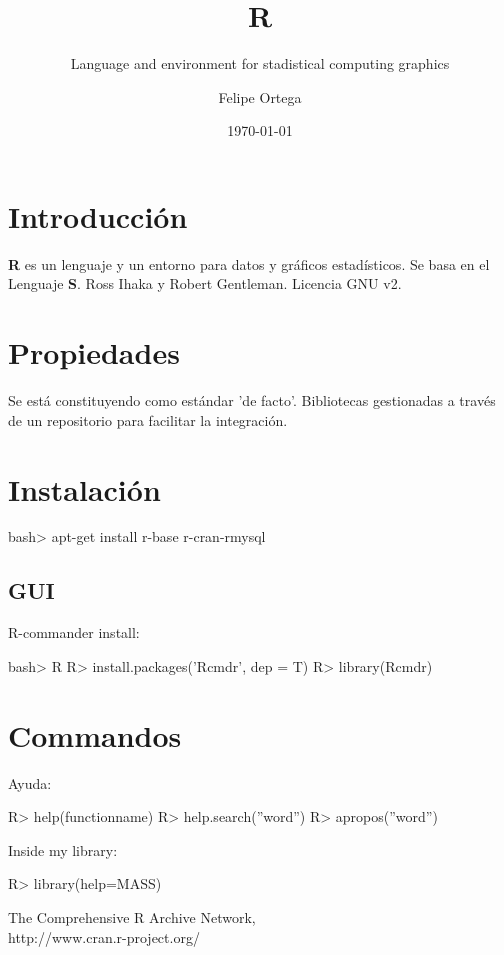 \documentclass[11pt]{scrartcl}
\title{\textbf{R}}
\subtitle{Language and environment for stadistical computing graphics}
\author{Felipe Ortega}
\date{\today}
\begin{document}
\maketitle

\section{Introducci\'on}

\textbf{R} es un lenguaje y un entorno para datos y gr\'aficos estad\'isticos.
Se basa en el Lenguaje \textbf{S}. 
Ross Ihaka y Robert Gentleman.
Licencia  GNU v2.

\section{Propiedades}

Se est\'a constituyendo como est\'andar 'de facto'.
Bibliotecas gestionadas a trav\'es de un repositorio para facilitar la integraci\'on.

\section{Instalaci\'on}

	bash> apt-get install r-base r-cran-rmysql

\subsection{GUI}

R-commander install:

	bash> R
	R> install.packages('Rcmdr', dep = T)
	R> library(Rcmdr)

\section{Commandos}

Ayuda:

	R> help(functionname)
	R> help.search(''word'')
	R> apropos(''word'')

Inside my library:

	R> library(help=MASS)

\begin{thebibliography}{9}

  The Comprehensive R Archive Network,\\
  http://www.cran.r-project.org/

\end{thebibliography}
\end{document}
